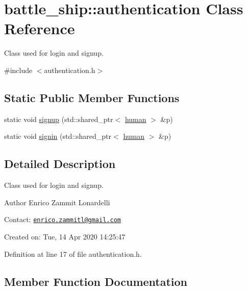 \hypertarget{classbattle__ship_1_1authentication}{}\section{battle\+\_\+ship\+:\+:authentication Class Reference}
\label{classbattle__ship_1_1authentication}


Class used for login and signup.  




{\ttfamily \#include $<$authentication.\+h$>$}

\subsection*{Static Public Member Functions}
\begin{DoxyCompactItemize}
\item 
static void \hyperlink{classbattle__ship_1_1authentication_aeb0c243e25547624235a562f657cfd63}{signup} (std\+::shared\+\_\+ptr$<$ \hyperlink{classbattle__ship_1_1human}{human} $>$ \&p)
\item 
static void \hyperlink{classbattle__ship_1_1authentication_a27046f1ace46e91bd6412ed35ddf0242}{signin} (std\+::shared\+\_\+ptr$<$ \hyperlink{classbattle__ship_1_1human}{human} $>$ \&p)
\end{DoxyCompactItemize}


\subsection{Detailed Description}
Class used for login and signup. 

\begin{DoxyAuthor}{Author}
Enrico Zammit Lonardelli
\end{DoxyAuthor}
Contact\+: \href{mailto:enrico.zammitl@gmail.com}{\tt enrico.\+zammitl@gmail.\+com}

Created on\+: Tue, 14 Apr 2020 14\+:25\+:47 

Definition at line 17 of file authentication.\+h.



\subsection{Member Function Documentation}
\mbox{\label{classbattle__ship_1_1authentication_a27046f1ace46e91bd6412ed35ddf0242}} 
